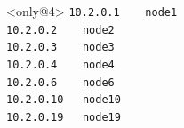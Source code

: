\documentclass{beamer}
\begin{document}
\begin{frame}[fragile,t]
\begin{textblock}{25}
    \begin{block}<only@4>{\vspace*{-3ex}}
    \scriptsize
    \verb;10.2.0.1    node1 ;\\
    \verb;10.2.0.2    node2 ;\\
    \verb;10.2.0.3    node3 ;\\
    \verb;10.2.0.4    node4 ;\\
    \verb;10.2.0.6    node6 ;\\
    \verb;10.2.0.10   node10;\\
    \verb;10.2.0.19   node19;\\
    \vspace*{0.5ex}
    \end{block}
    \end{textblock}
\end{frame}
\end{document}
